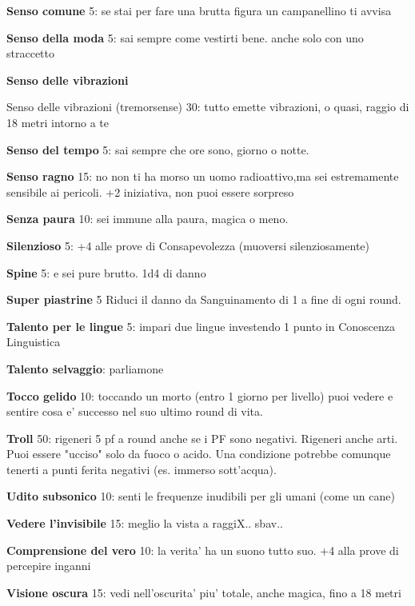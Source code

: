 \documentclass[a4paper,11pt,twoside,openany]{book}
\begin{document}
\textbf{Senso comune} 5: se stai per fare una brutta figura un campanellino ti avvisa

\textbf{Senso della moda} 5: sai sempre come vestirti bene. anche solo con uno straccetto

\textbf{Senso delle vibrazioni} {Senso delle vibrazioni  (tremorsense) 30: tutto emette vibrazioni, o quasi, raggio di 18 metri intorno a te

\textbf{Senso del tempo} 5: sai sempre che ore sono, giorno o notte.

\textbf{Senso ragno} 15: no non ti ha morso un uomo radioattivo,ma sei estremamente sensibile ai pericoli. +2 iniziativa, non puoi essere sorpreso

\textbf{Senza paura} 10: sei immune alla paura, magica o meno.

\textbf{Silenzioso} 5: +4 alle prove di Consapevolezza (muoversi silenziosamente)

\textbf{Spine} 5: e sei pure brutto. 1d4 di danno

\textbf{Super piastrine} 5 Riduci il danno da Sanguinamento di 1 a fine di ogni round.

\textbf{Talento per le lingue} 5: impari due lingue investendo 1 punto in Conoscenza Linguistica

\textbf{Talento selvaggio}: parliamone

\textbf{Tocco gelido} 10: toccando un morto (entro 1 giorno per livello) puoi vedere e sentire cosa e' successo nel suo ultimo round di vita.

\textbf{Troll} 50: rigeneri 5 pf a round anche se i PF sono negativi. Rigeneri anche arti. Puoi essere "ucciso" solo da fuoco o acido. Una condizione potrebbe comunque tenerti a punti ferita negativi (es. immerso sott'acqua).

\textbf{Udito subsonico} 10: senti le frequenze inudibili per gli umani (come un cane)

\textbf{Vedere l'invisibile} 15: meglio la vista a raggiX.. sbav..

\textbf{Comprensione del vero} 10: la verita' ha un suono tutto suo. +4 alla prove di percepire inganni

\textbf{Visione oscura} 15: vedi nell'oscurita' piu' totale, anche magica, fino a 18 metri

}
\end{document}
